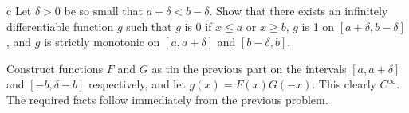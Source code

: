 \documentclass[11pt,letterpaper]{article}
\begin{document}
\begin{solution}
    \begin{partproblem}{c}
        Let $\delta > 0$ be so small that $a+\delta < b - \delta$. Show that there exists an infinitely differentiable function $g$ such that $g$ is 0 if $x \leq a$ or $x \geq b$, $g$ is 1 on $[a+\delta,b-\delta]$, and $g$ is strictly monotonic on $[a,a+\delta]$ and $[b-\delta,b]$.
    \end{partproblem}

    \quad Construct functions $F$ and $G$ as tin the previous part on the intervals $[a,a+\delta]$ and $[-b, \delta-b]$ respectively, and let $g(x)=F(x)G(-x)$. This clearly $C^\infty$. The required facts follow immediately from the previous problem.
\end{solution}
\end{document}
